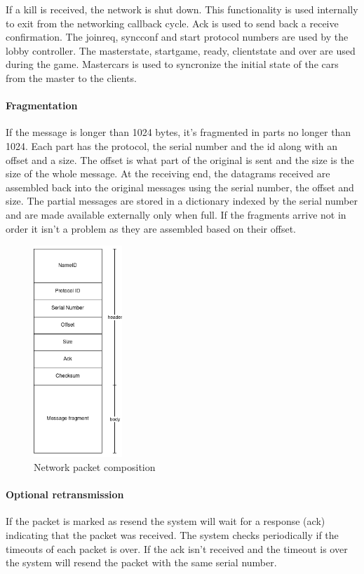 \documentclass[12pt]{article}
\begin{document}
If a kill is received, the network is shut down. This functionality is used internally to exit from the networking callback cycle. Ack is used to send back a receive confirmation. The joinreq, syncconf and start protocol numbers are used by the lobby controller. The masterstate, startgame, ready, clientstate and over are used during the game. Mastercars is used to syncronize the initial state of the cars from the master to the clients. \\

\clearpage

\paragraph{Fragmentation}
If the message is longer than 1024 bytes, it's fragmented in parts no longer than 1024. Each part has the protocol, the serial number and the id along with an offset and a size. The offset is what part of the original is sent and the size is the size of the whole message. At the receiving end, the datagrams received are assembled back into the original messages using the serial number, the offset and size. The partial messages are stored in a dictionary indexed by the serial number and are made available externally only when full. If the fragments arrive not in order it isn't a problem as they are assembled based on their offset.

\begin{figure}[H]
\begin{center}
\includegraphics[height=8cm]{packet}
\end{center}
\caption{Network packet composition}
\end{figure}

\paragraph{Optional retransmission}
If the packet is marked as resend the system will wait for a response (ack) indicating that the packet was received. The system checks periodically if the timeouts of each packet is over. If the ack isn't received and the timeout is over the system will resend the packet with the same serial number.
\end{document}
